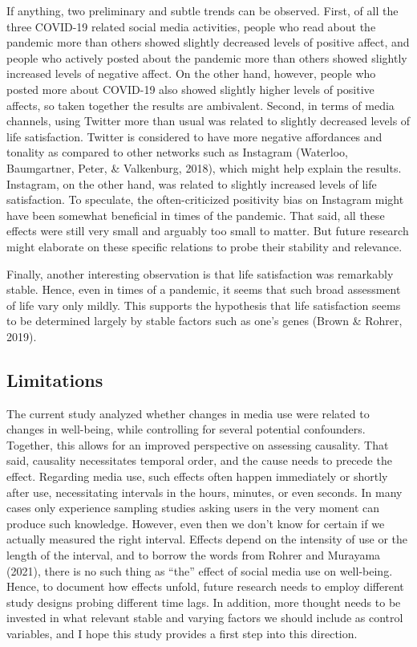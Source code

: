 \documentclass[
  english,
  man,floatsintext]{apa6}
\begin{document}
If anything, two preliminary and subtle trends can be observed.
First, of all the three COVID-19 related social media activities, people who read about the pandemic more than others showed slightly decreased levels of positive affect, and people who actively posted about the pandemic more than others showed slightly increased levels of negative affect.
On the other hand, however, people who posted more about COVID-19 also showed slightly higher levels of positive affects, so taken together the results are ambivalent.
Second, in terms of media channels, using Twitter more than usual was related to slightly decreased levels of life satisfaction.
Twitter is considered to have more negative affordances and tonality as compared to other networks such as Instagram (Waterloo, Baumgartner, Peter, \& Valkenburg, 2018), which might help explain the results.
Instagram, on the other hand, was related to slightly increased levels of life satisfaction.
To speculate, the often-criticized positivity bias on Instagram might have been somewhat beneficial in times of the pandemic.
That said, all these effects were still very small and arguably too small to matter.
But future research might elaborate on these specific relations to probe their stability and relevance.

Finally, another interesting observation is that life satisfaction was remarkably stable.
Hence, even in times of a pandemic, it seems that such broad assessment of life vary only mildly.
This supports the hypothesis that life satisfaction seems to be determined largely by stable factors such as one's genes (Brown \& Rohrer, 2019).

\hypertarget{limitations}{%
\subsection{Limitations}\label{limitations}}

The current study analyzed whether changes in media use were related to changes in well-being, while controlling for several potential confounders.
Together, this allows for an improved perspective on assessing causality.
That said, causality necessitates temporal order, and the cause needs to precede the effect.
Regarding media use, such effects often happen immediately or shortly after use, necessitating intervals in the hours, minutes, or even seconds.
In many cases only experience sampling studies asking users in the very moment can produce such knowledge.
However, even then we don't know for certain if we actually measured the right interval.
Effects depend on the intensity of use or the length of the interval, and to borrow the words from Rohrer and Murayama (2021), there is no such thing as ``the'' effect of social media use on well-being.
Hence, to document how effects unfold, future research needs to employ different study designs probing different time lags.
In addition, more thought needs to be invested in what relevant stable and varying factors we should include as control variables, and I hope this study provides a first step into this direction.
\end{document}
